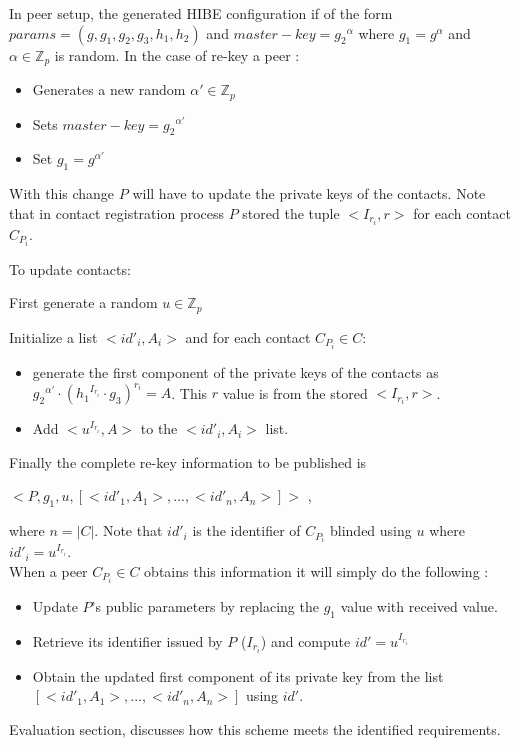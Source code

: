 In peer setup, the generated HIBE configuration if of the form  $params = (g, g_1, g_2, g_3, h_1, h_2)$ and $master-key = {g_2}^{\alpha}$ where $g_1 = g^{\alpha}$ and $\alpha \in \mathbb{Z}_p$ is random. In the case of re-key a peer :
\begin{itemize}
\item Generates a new random $\alpha' \in \mathbb{Z}_p$
\item Sets $master-key = {g_2}^{\alpha'}$
\item Set $g_1 = g^{\alpha'}$
\end{itemize}

With this change $P$ will have to update the private keys of the contacts. Note that in contact registration process $P$ stored the tuple $<I_{r_i}, r>$ for each contact $C_{P_i}$. 

To update contacts:

First generate a random $u \in \mathbb{Z}_p$

Initialize a list $<{id'}_i, A_i>$ and for each contact $C_{P_i} \in C$:
\begin{itemize}
\item generate the first component of the private keys of the contacts as ${{g_2}^{\alpha'}} \cdot {({{h_1}^{I_{r_i}}} \cdot {g_3} )}^{r_i} = A$. This $r$ value is from the stored $<I_{r_i}, r>$.
\item Add  $<{u^{I_{r_i}}}, A>$ to the $<{id'}_i, A_i>$ list.
\end{itemize}

Finally the complete re-key information to be published is 
\begin{center}
$<P, g_1, u, [<{id'}_1, A_1>, ...,  <{id'}_n, A_n>]>$ ,
\end{center} where $n = |C|$. Note that ${id'}_i$ is the identifier of $C_{P_i}$ blinded using $u$ where ${id'}_i = u^{I_{r_i}}$.\\

When a peer $C_{P_i} \in C$ obtains this information it will simply do the following :
\begin{itemize}
\item Update $P$'s public parameters by replacing the $g_1$ value with received value.
\item Retrieve its identifier issued by $P$ ($I_{r_i}$) and compute $id' = u^{I_{r_i}}$
\item Obtain the updated first component of its private key from the list $[<{id'}_1, A_1>, ...,  <{id'}_n, A_n>]$ using $id'$.\\
\end{itemize}

Evaluation section, discusses how this scheme meets the identified requirements.
